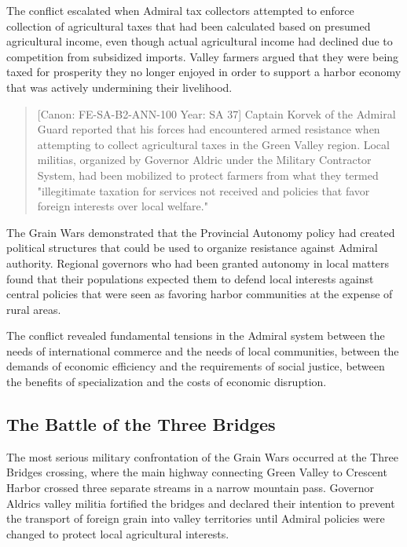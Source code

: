 The conflict escalated when Admiral tax collectors attempted to enforce
collection of agricultural taxes that had been calculated based on
presumed agricultural income, even though actual agricultural income had
declined due to competition from subsidized imports. Valley farmers
argued that they were being taxed for prosperity they no longer enjoyed
in order to support a harbor economy that was actively undermining their
livelihood.

\begin{quote}
{[}Canon: FE-SA-B2-ANN-100 \textbar{} Year: SA 37{]} Captain Korvek of
the Admiral Guard reported that his forces had encountered armed
resistance when attempting to collect agricultural taxes in the Green
Valley region. Local militias, organized by Governor Aldric under the
Military Contractor System, had been mobilized to protect farmers from
what they termed "illegitimate taxation for services not received and
policies that favor foreign interests over local welfare."
\end{quote}

The Grain Wars demonstrated that the Provincial Autonomy policy had
created political structures that could be used to organize resistance
against Admiral authority. Regional governors who had been granted
autonomy in local matters found that their populations expected them to
defend local interests against central policies that were seen as
favoring harbor communities at the expense of rural areas.

The conflict revealed fundamental tensions in the Admiral system between
the needs of international commerce and the needs of local communities,
between the demands of economic efficiency and the requirements of
social justice, between the benefits of specialization and the costs of
economic disruption.

\subsection{The Battle of the Three
Bridges}\label{the-battle-of-the-three-bridges}

The most serious military confrontation of the Grain Wars occurred at
the Three Bridges crossing, where the main highway connecting Green
Valley to Crescent Harbor crossed three separate streams in a narrow
mountain pass. Governor Aldric\textquotesingle s valley militia
fortified the bridges and declared their intention to prevent the
transport of foreign grain into valley territories until Admiral
policies were changed to protect local agricultural interests.

